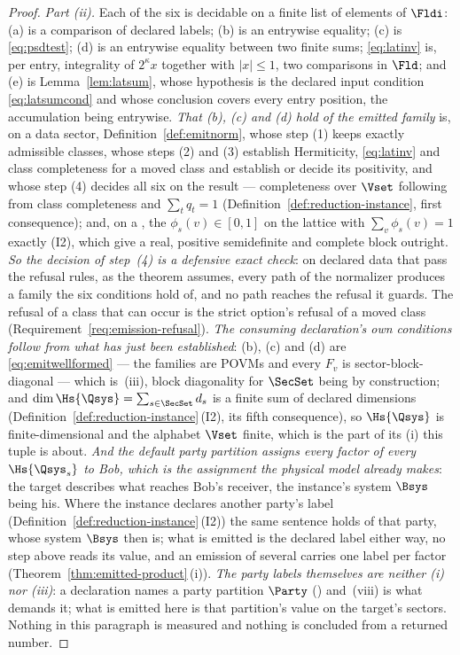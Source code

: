 \begin{proof}
\emph{Part (ii).} Each of the six is decidable on a finite list of elements
of $\Fldi$: (a) is a comparison of declared labels; (b) is an entrywise
equality; (c) is \eqref{eq:psdtest}; (d) is an entrywise equality between two
finite sums; \eqref{eq:latinv} is, per entry, integrality of $2^{\kappa}x$
together with $|x|\le1$, two comparisons in $\Fld$; and (e) is
Lemma~\ref{lem:latsum}, whose hypothesis is the declared input condition
\eqref{eq:latsumcond} and whose conclusion covers every entry position, the
accumulation being entrywise.
\emph{That (b), (c) and (d) hold of the emitted family} is, on a data sector,
Definition~\ref{def:emitnorm}, whose step (1) keeps exactly admissible
classes, whose steps (2) and (3) establish Hermiticity, \eqref{eq:latinv}
and class completeness for a moved class and establish or decide its
positivity, and whose step (4) decides all six on the result ---
completeness over $\Vset$ following from class completeness and
$\sum_tq_t=1$ (Definition~\ref{def:reduction-instance}, first consequence);
and, on a , the 
$\phi_s(v)\in[0,1]$ on the
lattice with $\sum_v\phi_s(v)=1$ exactly (I2), which give a real, positive
semidefinite and complete block outright.
\emph{So the decision of step~(4) is a defensive exact check}: on declared
data that pass the refusal rules, as the theorem assumes, every path of the
normalizer produces a family the six conditions hold of, and no path reaches
the refusal it guards. The refusal of a class that can occur is the strict
option's refusal of a moved class (Requirement~\ref{req:emission-refusal}).
\emph{The consuming declaration's own conditions follow from what has just
been established}: (b), (c) and (d) are \eqref{eq:emitwellformed} --- the
families are POVMs and every $F_v$ is sector-block-diagonal --- which is
\,(iii), block diagonality for $\SecSet$ being by
construction; and $\dim\Hs{\Qsys}=\sum_{s\in\SecSet}d_s$ is a finite sum of
declared dimensions (Definition~\ref{def:reduction-instance}\,(I2), its fifth
consequence), so $\Hs{\Qsys}$ is finite-dimensional and the alphabet $\Vset$
finite, which is the part of its (i) this tuple is about. \emph{And the
default party partition assigns every factor of every $\Hs{\Qsys_s}$ to Bob,
which is the assignment the physical model already makes}: the target
describes what reaches Bob's receiver, the instance's system $\Bsys$ being
his. Where the instance declares another party's label
(Definition~\ref{def:reduction-instance}\,(I2)) the same sentence holds of
that party, whose system $\Bsys$ then is; what is emitted is the declared
label either way, no step above reads its value, and an emission of several
 carries one label per factor
(Theorem~\ref{thm:emitted-product}\,(i)). \emph{The party labels themselves
are neither (i) nor (iii)}: a declaration names a party partition $\Party$
() and \,(viii) is
what demands it; what is emitted here is that partition's value on the
target's sectors. Nothing in this paragraph is measured and nothing is
concluded from a returned number.


\end{proof}
